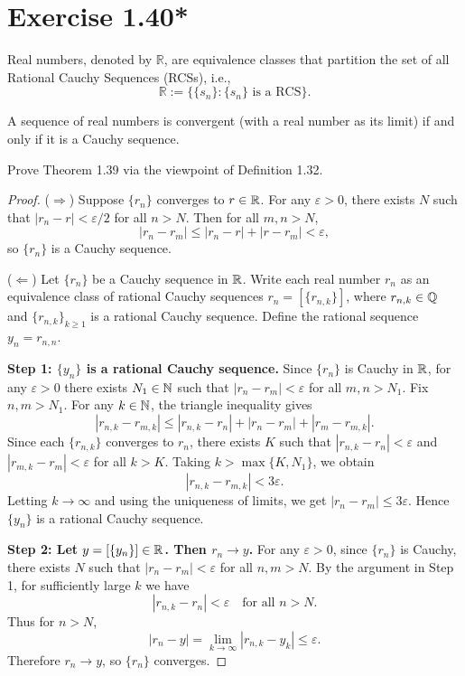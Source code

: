 \documentclass{article}
\begin{document}
\section{Exercise 1.40*}

\begin{definition}
  Real numbers, denoted by $\mathbb{R}$, are equivalence classes that
  partition the set of all Rational Cauchy Sequences (RCSs), i.e.,
  \[
    \mathbb{R} := \{ \{s_n\} : \{s_n\} \text{ is a RCS} \}.
  \]
\end{definition}

\begin{theorem}
  A sequence of real numbers is convergent (with a real number as its
  limit) if and only if it is a Cauchy sequence.
\end{theorem}

Prove Theorem 1.39 via the viewpoint of Definition 1.32.

\begin{proof}
  ($\Rightarrow$) Suppose $\{r_n\}$ converges to $r \in \mathbb{R}$. For any
  $\varepsilon > 0$, there exists $N$ such that $|r_n - r| < \varepsilon/2$
  for all $n > N$. Then for all $m, n > N$,
  \[
    |r_n - r_m| \le |r_n - r| + |r - r_m| < \varepsilon,
  \]
  so $\{r_n\}$ is a Cauchy sequence.

  ($\Leftarrow$) Let $\{r_n\}$ be a Cauchy sequence in $\mathbb{R}$. Write each
  real number $r_n$ as an equivalence class of rational Cauchy sequences
  $r_n = [\{r_{n,k}\}]$, where $r_{n,k} \in \mathbb{Q}$ and $\{r_{n,k}\}_{k\ge1}$
  is a rational Cauchy sequence. Define the rational sequence $y_n =
  r_{n,n}$.

  \textbf{Step 1: $\{y_n\}$ is a rational Cauchy sequence.} Since
  $\{r_n\}$ is Cauchy in $\mathbb{R}$, for any $\varepsilon > 0$ there exists
  $N_1 \in \mathbb{N}$ such that $|r_n - r_m| < \varepsilon$ for all $m, n > N_1$.
  Fix $n, m > N_1$. For any $k \in \mathbb{N}$, the triangle inequality gives
  \[
    |r_{n,k} - r_{m,k}| \le |r_{n,k} - r_n| + |r_n - r_m| + |r_m - r_{m,k}|.
  \]
  Since each $\{r_{n,k}\}$ converges to $r_n$, there exists $K$ such that
  $|r_{n,k} - r_n| < \varepsilon$ and $|r_{m,k} - r_m| < \varepsilon$ for
  all $k > K$. Taking $k > \max\{K, N_1\}$, we obtain
  \[
    |r_{n,k} - r_{m,k}| < 3\varepsilon.
  \]
  Letting $k \to \infty$ and using the uniqueness of limits, we get
  $|r_n - r_m| \le 3\varepsilon$. Hence $\{y_n\}$ is a rational Cauchy
  sequence.

  \textbf{Step 2: Let $y = [\{y_n\}] \in \mathbb{R}$. Then $r_n \to y$.} For any
  $\varepsilon > 0$, since $\{r_n\}$ is Cauchy, there exists $N$ such that
  $|r_n - r_m| < \varepsilon$ for all $n, m > N$. By the argument in Step
  1, for sufficiently large $k$ we have
  \[
    |r_{n,k} - r_n| < \varepsilon \quad \text{for all } n > N.
  \]
  Thus for $n > N$,
  \[
    |r_n - y| = \lim_{k\to\infty} |r_{n,k} - y_k| \le \varepsilon.
  \]
  Therefore $r_n \to y$, so $\{r_n\}$ converges.
\end{proof}
\end{document}
